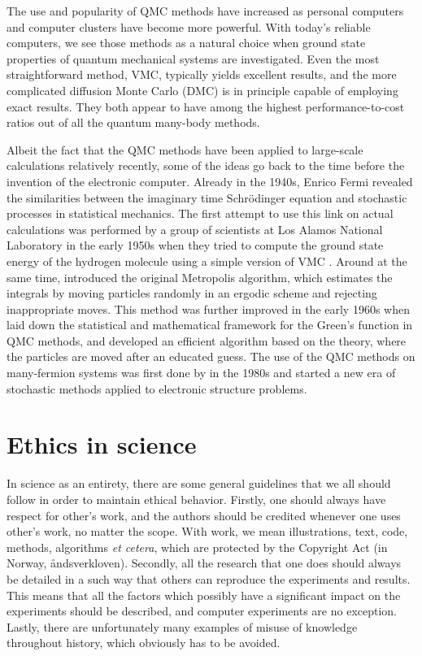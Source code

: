 The use and popularity of QMC methods have increased as personal computers and computer clusters have become more powerful. With today's reliable computers, we see those methods as a natural choice when ground state properties of quantum mechanical systems are investigated. Even the most straightforward method, VMC, typically yields excellent results, and the more complicated diffusion Monte Carlo (DMC) is in principle capable of employing exact results. They both appear to have among the highest performance-to-cost ratios out of all the quantum many-body methods. 

Albeit the fact that the QMC methods have been applied to large-scale calculations relatively recently, some of the ideas go back to the time before the invention of the electronic computer. Already in the 1940s, Enrico Fermi revealed the similarities between the imaginary time Schrödinger equation and stochastic processes in statistical mechanics. The first attempt to use this link on actual calculations was performed by a group of scientists at Los Alamos National Laboratory in the early 1950s when they tried to compute the ground state energy of the hydrogen molecule using a simple version of VMC \supercite{bajdich_electronic_2010}. Around at the same time, \citet{metropolis_monte_1949} introduced the original Metropolis algorithm, which estimates the integrals by moving particles randomly in an ergodic scheme and rejecting inappropriate moves. This method was further improved in the early 1960s when \citet{kalos} laid down the statistical and mathematical framework for the Green's function in QMC methods, and \citet{hastings_monte_1970} developed an efficient algorithm based on the theory, where the particles are moved after an educated guess. The use of the QMC methods on many-fermion systems was first done by \citet{ceperley_quantum_1986} in the 1980s and started a new era of stochastic methods applied to electronic structure problems. 

\section{Ethics in science}
In science as an entirety, there are some general guidelines that we all should follow in order to maintain ethical behavior. Firstly, one should always have respect for other's work, and the authors should be credited whenever one uses other's work, no matter the scope. With work, we mean illustrations, text, code, methods, algorithms \textit{et cetera}, which are protected by the Copyright Act (in Norway, åndsverkloven). Secondly, all the research that one does should always be detailed in a such way that others can reproduce the experiments and results. This means that all the factors which possibly have a significant impact on the experiments should be described, and computer experiments are no exception. Lastly, there are unfortunately many examples of misuse of knowledge throughout history, which obviously has to be avoided.

